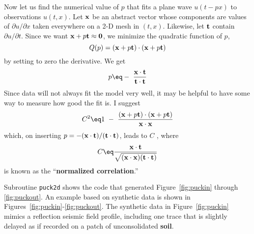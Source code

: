 Now let us find the numerical value of $p$ that fits a plane wave
$u(t-px)$ to  observations $u (t , x )$. Let $\bold x$ be an abstract
vector whose components are values of $\partial u /\partial x$ taken
everywhere on a 2-D mesh in $(t,x)$. Likewise, let $\bold t$ contain $\partial u /\partial t$.  Since we want ${\bf x} + p {\bf t} \approx {\bf 0}$, we minimize the quadratic function of $p$, 
\begin{equation}
Q( p) = ({\bf x} + p {\bf t}) \cdot ({\bf x} + p {\bf t}) 
\end{equation}
by setting to zero the derivative. We get 
\begin{equation}
p \eq - \ \frac{ {\bf x} \cdot {\bf t} }{ {\bf t} \cdot {\bf t} } 
\end{equation}
Since data will not always fit the model very well, it may be helpful to have some way to measure how good the fit is. I suggest
\begin{equation}
C^2 \eq 1 \ -\  \frac{ ({\bf x} + p {\bf t}) \cdot ({\bf x} + p {\bf t}) }{ {\bf x} \cdot {\bf x}} 
\end{equation}
which, on inserting $p=-({\bf x} \cdot {\bf t})/({\bf t} \cdot {\bf t})$, leads to $C$ , where 
\begin{equation}
C \eq \frac{ {\bf x} \cdot {\bf t} } { \sqrt{ ( {\bf x} \cdot {\bf x} ) ( {\bf t}\cdot{\bf t}) }}
\end{equation} 
is known as the ``{\bf normalized correlation}.''   






Subroutine {\tt puck2d} shows the code that generated
Figure~\ref{fig:puckin} through \ref{fig:puckout}.
An example based on synthetic data is shown
in Figures~\ref{fig:puckin}-\ref{fig:puckout}.
The synthetic data in Figure~\ref{fig:puckin} mimics
a reflection seismic field profile,
including one trace that is slightly delayed
as if recorded on a patch of unconsolidated {\bf soil}. 

